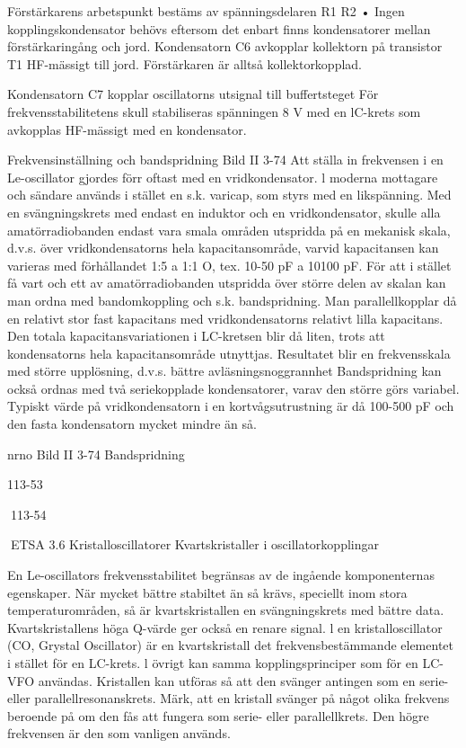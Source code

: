 \documentclass[a4paper,twoside,twocolumn,openright]{book}
\begin{document}
{{{{{{{{Förstärkarens arbetspunkt bestäms av
spänningsdelaren R1 R2 • Ingen kopplingskondensator behövs eftersom det enbart
finns kondensatorer mellan förstärkaringång
och jord.
Kondensatorn C6 avkopplar kollektorn på
transistor T1 HF-mässigt till jord. Förstärkaren är alltså kollektorkopplad.

Kondensatorn C7 kopplar oscillatorns utsignal till buffertsteget För frekvensstabilitetens skull stabiliseras spänningen 8 V med
en lC-krets som avkopplas HF-mässigt med
en kondensator.

Frekvensinställning och bandspridning
Bild II 3-74
Att ställa in frekvensen i en Le-oscillator
gjordes förr oftast med en vridkondensator.
l moderna mottagare och sändare används
i stället en s.k. varicap, som styrs med en
likspänning.
Med en svängningskrets med endast en
induktor och en vridkondensator, skulle alla
amatörradiobanden endast vara smala områden utspridda på en mekanisk skala, d.v.s.
över vridkondensatorns hela kapacitansområde, varvid kapacitansen kan varieras med
förhållandet 1:5 a 1:1 O, tex. 10-50 pF a 10100 pF.
För att i stället få vart och ett av amatörradiobanden utspridda över större delen av
skalan kan man ordna med bandomkoppling
och s.k. bandspridning. Man parallellkopplar
då en relativt stor fast kapacitans med vridkondensatorns relativt lilla kapacitans. Den
totala kapacitansvariationen i LC-kretsen blir
då liten, trots att kondensatorns hela kapacitansområde utnyttjas. Resultatet blir en frekvensskala med större upplösning, d.v.s. bättre avläsningsnoggrannhet
Bandspridning kan också ordnas med
två seriekopplade kondensatorer, varav den
större görs variabel. Typiskt värde på vridkondensatorn i en kortvågsutrustning är då
100-500 pF och den fasta kondensatorn
mycket mindre än så.

nrno
Bild II 3-74 Bandspridning

113-53

113-54

ETSA
3.6 Kristalloscillatorer
Kvartskristaller i oscillatorkopplingar

En Le-oscillators frekvensstabilitet begränsas av de ingående komponenternas egenskaper. När mycket bättre stabiltet än så
krävs, speciellt inom stora temperaturområden, så är kvartskristallen en svängningskrets med bättre data. Kvartskristallens höga
Q-värde ger också en renare signal.
l en kristalloscillator (CO, Grystal Oscillator) är en kvartskristall det frekvensbestämmande elementet i stället för en LC-krets. l
övrigt kan samma kopplingsprinciper som
för en LC-VFO användas.
Kristallen kan utföras så att den svänger
antingen som en serie- eller parallellresonanskrets. Märk, att en kristall svänger på
något olika frekvens beroende på om den fås
att fungera som serie- eller parallellkrets.
Den högre frekvensen är den som vanligen
används.

}}}}}}}}
\end{document}

